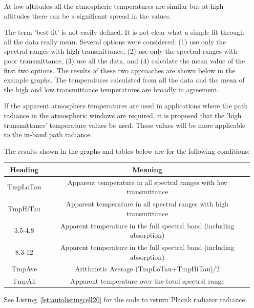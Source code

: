\documentclass{workpackage}
\begin{document}
At low altitudes all the atmospheric temperatures are similar but at high altitudes there can be a significant spread in the values.


The term 'best fit' is not easily defined.  It is not clear what a simple fit through all the data really mean.  Several options were considered: (1) use only the spectral ranges with high transmittance, (2) use only the spectral ranges with poor transmittance, (3) use all the data, and (4) calculate the mean value of the first two options.
The results of these two approaches are shown below in the example graphs.  The temperatures calculated from all the data and the mean of the high and low transmittance temperatures are broadly in agreement.


If the apparent atmosphere temperatures are used in applications where the path radiance in the atmospheric windows are required, it is proposed that the 'high transmittance' temperature values be used. These values will be more applicable to the in-band path radiance.


The results shown in the graphs and tables below are for the following conditions:


\begin{center}

\begin{normalsize}

\begin{tabular}{|c|c|}
\hline
Heading&Meaning\\\hline
TmpLoTau&Apparent temperature in all spectral ranges with low transmittance\\\hline
TmpHiTau&Apparent temperature in all spectral ranges with high transmittance\\\hline
3.5-4.8&Apparent temperature in the full spectral band (including absorption)\\\hline
8.3-12&Apparent temperature in the full spectral band (including absorption)\\\hline
TmpAve&Arithmetic Average (TmpLoTau+TmpHiTau)/2\\\hline
TmpAll&Apparent temperature over the total spectral range\\\hline

\end{tabular}
\end{normalsize}
\end{center}



See Listing~\ref{lst:autolistingcell20} for the code to return Placnk radiator radiance.
\end{document}
